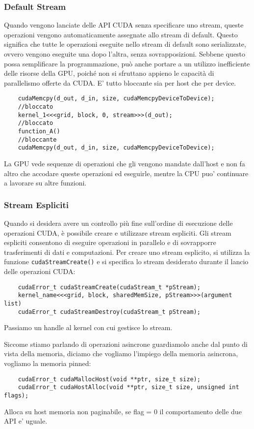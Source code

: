 \subsubsection{Default Stream}
Quando vengono lanciate delle API CUDA senza specificare uno stream, queste operazioni vengono automaticamente assegnate allo stream di default. Questo significa che tutte le operazioni eseguite nello stream di default sono serializzate, ovvero vengono eseguite una dopo l'altra, senza sovrapposizioni. Sebbene questo possa semplificare la programmazione, può anche portare a un utilizzo inefficiente delle risorse della GPU, poiché non si sfruttano appieno le capacità di parallelismo offerte da CUDA.
E' tutto bloccante sia per host che per device.
\begin{lstlisting}
    cudaMemcpy(d_out, d_in, size, cudaMemcpyDeviceToDevice);
    //bloccato
    kernel_1<<<grid, block, 0, stream>>>(d_out);
    //bloccato
    function_A()
    //bloccante
    cudaMemcpy(d_out, d_in, size, cudaMemcpyDeviceToDevice);
\end{lstlisting}

La GPU vede sequenze di operazioni che gli vengono mandate dall'host e non fa altro che accodare queste operazioni ed eseguirle, mentre la CPU puo' continuare a lavorare su altre funzioni.

\subsubsection{Stream Espliciti}
Quando si desidera avere un controllo più fine sull'ordine di esecuzione delle operazioni CUDA, è possibile creare e utilizzare stream espliciti. Gli stream espliciti consentono di eseguire operazioni in parallelo e di sovrapporre trasferimenti di dati e computazioni. Per creare uno stream esplicito, si utilizza la funzione \texttt{cudaStreamCreate()} e si specifica lo stream desiderato durante il lancio delle operazioni CUDA:
\begin{lstlisting}
    cudaError_t cudaStreamCreate(cudaStream_t *pStream);
    kernel_name<<<grid, block, sharedMemSize, pStream>>>(argument list)
    cudaError_t cudaStreamDestroy(cudaStream_t pStream);
\end{lstlisting}
Passiamo un handle al kernel con cui gestisce lo stream.

Siccome stiamo parlando di operazioni asincrone guardiamolo anche dal punto di vista della memoria, diciamo che vogliamo l'impiego della memoria asincrona, vogliamo la memoria pinned:
\begin{lstlisting}
    cudaError_t cudaMallocHost(void **ptr, size_t size);
    cudaError_t cudaHostAlloc(void **ptr, size_t size, unsigned int flags);
\end{lstlisting}
Alloca su host memoria non paginabile, se flag = 0 il comportamento delle due API e' uguale.

